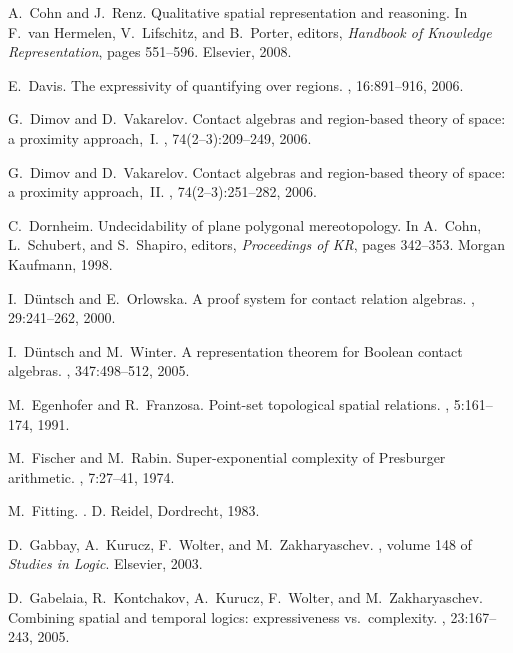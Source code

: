 \documentclass{LMCS}
\theoremstyle{plain}
\begin{document}
\begin{thebibliography}{10}
A.~Cohn and J.~Renz.
\newblock Qualitative spatial representation and reasoning.
\newblock In F.~van Hermelen, V.~Lifschitz, and B.~Porter, editors, {\em
  Handbook of Knowledge Representation}, pages 551--596. Elsevier, 2008.

E.~Davis.
\newblock The expressivity of quantifying over regions.
, 16:891--916, 2006.

G.~Dimov and D.~Vakarelov.
\newblock Contact algebras and region-based theory of space: a proximity
  approach,~{I}.
, 74(2--3):209--249, 2006.

G.~Dimov and D.~Vakarelov.
\newblock Contact algebras and region-based theory of space: a proximity
  approach,~{II}.
, 74(2--3):251--282, 2006.

C.~Dornheim.
\newblock Undecidability of plane polygonal mereotopology.
\newblock In A.~Cohn, L.~Schu\-bert, and S.~Shapiro, editors, {\em Proceedings of KR},
  pages 342--353. Morgan Kaufmann, 1998.

I.~D{\"u}ntsch and E.~Orlowska.
\newblock A proof system for contact relation algebras.
, 29:241--262, 2000.

I.~D{\"{u}}ntsch and M.~Winter.
\newblock A representation theorem for {B}oolean contact algebras.
, 347:498--512, 2005.

M.~Egenhofer and R.~Franzosa.
\newblock Point-set topological spatial relations.
,
  5:161--174, 1991.

M.~Fischer and M.~Rabin.
\newblock Super-exponential complexity of {P}resburger arithmetic.
, 7:27--41,
  1974.

M.~Fitting.
.
\newblock D. Reidel, Dordrecht, 1983.

D.~Gabbay, A.~Kurucz, F.~Wolter, and M.~Zakharyaschev.
, volume
  148 of {\em Studies in Logic}.
\newblock Elsevier, 2003.

D.~Gabelaia, R.~Kontchakov, A.~Kurucz, F.~Wolter, and M.~Zakharyaschev.
\newblock Combining spatial and temporal logics: expressiveness vs.\
  complexity.
,
  23:167--243, 2005.


\end{thebibliography}
\end{document}
